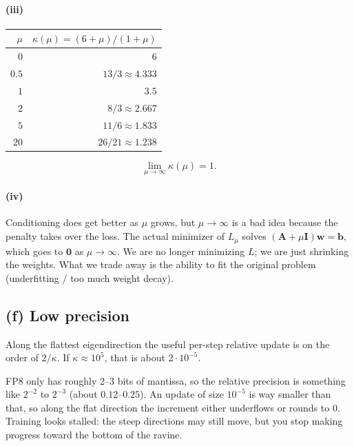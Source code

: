 \documentclass[11pt]{article}
\newcommand{\vct}[1]{\mathbf{#1}}
\newcommand{\mat}[1]{\mathbf{#1}}
\begin{document}
\paragraph{(iii)}
\begin{center}
\begin{tabular}{rr}
    \toprule
    \(\mu\) & \(\kappa(\mu)=(6+\mu)/(1+\mu)\) \\
    \midrule
    \(0\)    & \(6\) \\
    \(0.5\)  & \(13/3 \approx 4.333\) \\
    \(1\)    & \(3.5\) \\
    \(2\)    & \(8/3 \approx 2.667\) \\
    \(5\)    & \(11/6 \approx 1.833\) \\
    \(20\)   & \(26/21 \approx 1.238\) \\
    \bottomrule
\end{tabular}
\end{center}
\[
\lim_{\mu\to\infty}\kappa(\mu) = 1.
\]

\paragraph{(iv)}
Conditioning does get better as \(\mu\) grows, but \(\mu\to\infty\) is a
bad idea because the penalty takes over the loss. The actual minimizer of
\(L_\mu\) solves \((\mat{A}+\mu\mat{I})\vct{w}=\vct{b}\), which goes to
\(\vct{0}\) as \(\mu\to\infty\). We are no longer minimizing \(L\); we are
just shrinking the weights. What we trade away is the ability to fit the
original problem (underfitting / too much weight decay).

\subsection*{(f) Low precision}

Along the flattest eigendirection the useful per-step relative update is
on the order of \(2/\kappa\). If \(\kappa\approx 10^5\), that is about
\(2\cdot 10^{-5}\).

FP8 only has roughly 2--3 bits of mantissa, so the relative precision is
something like \(2^{-2}\) to \(2^{-3}\) (about \(0.12\)--\(0.25\)). An
update of size \(10^{-5}\) is way smaller than that, so along the flat
direction the increment either underflows or rounds to \(0\). Training
looks stalled: the steep directions may still move, but you stop making
progress toward the bottom of the ravine.
\end{document}
